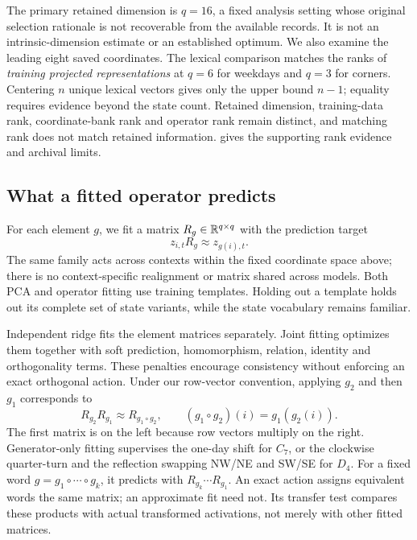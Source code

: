 The primary retained dimension is $q=16$, a fixed analysis setting whose original selection rationale is not recoverable from the available records. It is not an intrinsic-dimension estimate or an established optimum. We also examine the leading eight saved coordinates. The lexical comparison matches the ranks of \emph{training projected representations} at $q=6$ for weekdays and $q=3$ for corners. Centering $n$ unique lexical vectors gives only the upper bound $n-1$; equality requires evidence beyond the state count. Retained dimension, training-data rank, coordinate-bank rank and operator rank remain distinct, and matching rank does not match retained information.  gives the supporting rank evidence and archival limits.

\subsection{What a fitted operator predicts}
For each element $g$, we fit a matrix $R_g\in\mathbb{R}^{q\times q}$ with the prediction target
\begin{equation}
 z_{i,t}R_g\approx z_{g(i),t}.
 \label{eq:prediction}
\end{equation}
The same family acts across contexts within the fixed coordinate space above; there is no context-specific realignment or matrix shared across models. Both PCA and operator fitting use training templates. Holding out a template holds out its complete set of state variants, while the state vocabulary remains familiar.

Independent ridge fits the element matrices separately. Joint fitting optimizes them together with soft prediction, homomorphism, relation, identity and orthogonality terms. These penalties encourage consistency without enforcing an exact orthogonal action. Under our row-vector convention, applying $g_2$ and then $g_1$ corresponds to
\begin{equation}
 R_{g_2}R_{g_1}\approx R_{g_1\circ g_2},
 \qquad (g_1\circ g_2)(i)=g_1(g_2(i)).
 \label{eq:convention}
\end{equation}
The first matrix is on the left because row vectors multiply on the right. Generator-only fitting supervises the one-day shift for $C_7$, or the clockwise quarter-turn and the reflection swapping NW/NE and SW/SE for $D_4$. For a fixed word $g=g_1\circ\cdots\circ g_k$, it predicts with $R_{g_k}\cdots R_{g_1}$. An exact action assigns equivalent words the same matrix; an approximate fit need not. Its transfer test compares these products with actual transformed activations, not merely with other fitted matrices.

